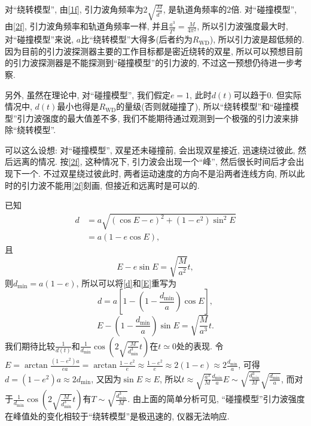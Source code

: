 \documentclass[12pt]{ctexart}
\begin{document}
对``绕转模型'', 由\eqref{1f}, 引力波角频率为$2\sqrt{\frac{ M}{d^3}}$, 是轨道角频率的$2$倍. 对``碰撞模型'', 由\eqref{2f}, 引力波角频率和轨道角频率一样, 并且$\frac{a^3}{T^2}=\frac{M}{4\pi^2}$, 所以引力波强度最大时, 对``碰撞模型''来说, $a$比``绕转模型''大得多(后者约为$R_\text{WD}$), 所以引力波是超低频的. 因为目前的引力波探测器主要的工作目标都是密近绕转的双星, 所以可以预想目前的引力波探测器是不能探测到``碰撞模型''的引力波的, 不过这一预想仍待进一步考察.

另外, 虽然在理论中, 对``碰撞模型'', 我们假定$e=1$, 此时$d(t)$可以趋于$0$. 但实际情况中, $d(t)$最小也得是$R_\text{WD}$的量级(否则就碰撞了), 所以``绕转模型''和``碰撞模型''引力波强度的最大值差不多, 我们不能期待通过观测到一个极强的引力波来排除``绕转模型''.

可以这么设想: 对``碰撞模型'', 双星还未碰撞前, 会出现双星接近, 迅速绕过彼此, 然后远离的情况. 按\eqref{2f}, 这种情况下, 引力波会出现一个``峰'', 然后很长时间后才会出现下一个. 不过双星绕过彼此时, 两者运动速度的方向不是沿两者连线方向, 所以此时的引力波不能用\eqref{2f}刻画, 但接近和远离时是可以的.

已知
\begin{align}
    d&=a\sqrt{(\cos E-e)^2+(1-e^2)\sin^2E}\\
    &=a(1-e\cos E),\label{d}
\end{align}
且
\begin{equation}
    E-e\sin E=\sqrt{\frac{M}{a^2}}t,\label{E}
\end{equation}
则$d_\text{min}=a(1-e)$, 所以可以将\eqref{d}和\eqref{E}重写为
\begin{equation}
    d=a\left[1-\left(1-\frac{d_\text{min}}{a}\right)\cos E\right],
\end{equation}
\begin{equation}
    E-\left(1-\frac{d_\text{min}}{a}\right)\sin E=\sqrt{\frac{M}{a^3}}t.
\end{equation}
我们期待比较$\frac{1}{d(t)}$和$\frac{1}{d_\text{min}}\cos\left(2\sqrt{\frac{ M}{d_\text{min}^3}}t\right)$在$t\simeq0$处的表现. 令$ E=\arctan\frac{(1-e^2)a}{ea}=\arctan\frac{1-e^2}{e}\approx\frac{1-e^2}{e}\approx2(1-e)\approx2\frac{d_\text{min}}{a}$, 可得$d=(1-e^2)a\approx2d_\text{min}$, 又因为$\sin E\approx E$, 所以$t\approx\sqrt{\frac{a^3}{M}}\frac{d_\text{min}}{a}E\sim\sqrt{\frac{d_\text{min}^3}{M}}\sqrt{\frac{d_\text{min}}{a}}$, 而对于$\frac{1}{d_\text{min}}\cos\left(2\sqrt{\frac{ M}{d_\text{min}^3}}t\right)$有$T\sim\sqrt{\frac{d_\text{min}^3}{M}}$. 由上面的简单分析可见, ``碰撞模型''引力波强度在峰值处的变化相较于``绕转模型''是极迅速的, 仪器无法响应.
\end{document}

